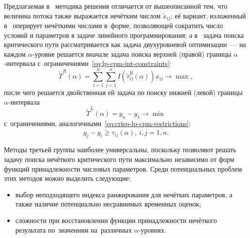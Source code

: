 Предлагаемая в~\cite{Indians_FCPM} методика решения отличается от вышеописанной тем, что величина потока также выражается нечётким числом $\tilde x_{ij}$; её вариант, изложенный в~\cite{Kumar_FCPM_Triangular} оперирует нечёткими числами в~форме, позволяющей сократить число условий и параметров в задаче линейного программирования; а в~\cite{Egyptians, Chen_CPM} задача поиска критического пути рассматривается как задача двухуровневой оптимизации~--- на каждом $\alpha$-уровне решается вначале задача поиска верхней (правой) границы $\alpha$-интервала с~ограничениями~\eqref{eq:lp-cpm-int-constraints}:
\begin{equation*}
  \tilde T^R \left( \alpha \right) = \sum \limits_{i=1}^{n} \sum \limits_{j=1}^{n} I\left(\tilde \tau_{ij}^R \left(\alpha \right) \right)x_{ij} \to \max,
\end{equation*}
после чего решается двойственная ей задача по поиску нижней (левой) границы $\alpha$-интервала
\begin{equation*}
  \tilde T^L \left( \alpha \right) = y_n-y_1 \to \min
\end{equation*}
с~ограничениями, аналогичными~\eqref{eq:crisp-lp-cpm-restrictions}:
\begin{equation*}
  y_j-y_i \geqslant \tau_{ij}\left( \alpha \right),\ i,j=\overline{1, n}.
\end{equation*}

Методы третьей группы наиболее универсальны, поскольку позволяют решать задачу поиска нечёткого критического пути максимально независимо от форм функций принадлежности числовых параметров. Среди потенциальных проблем этих методов можно выделить следующие:
\begin{itemize}
  \item выбор неподходящего индекса ранжирования для нечётких параметров, а также наличие потенциально несравнимых временных оценок;
  \item сложности при восстановлении функции принадлежности нечёткого результата по~значениям на~различных $\alpha$-уровнях.
\end{itemize}
